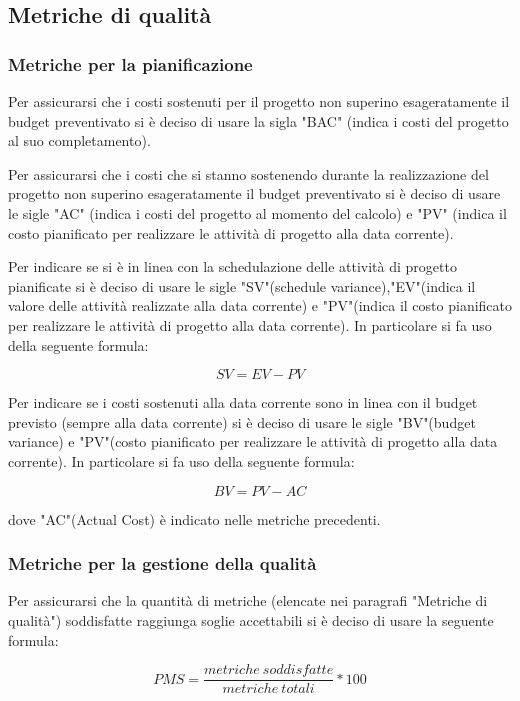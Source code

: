 \subsection{Metriche di qualità}
\subsubsection{Metriche per la pianificazione}
Per assicurarsi che i costi sostenuti per il progetto non superino esageratamente il budget preventivato si è deciso di usare la sigla "BAC" (indica i costi del progetto al suo completamento).

Per assicurarsi che i costi che si stanno sostenendo durante la realizzazione del progetto non superino esageratamente il budget preventivato si è deciso di usare le sigle "AC" (indica i costi del progetto al momento del calcolo) e "PV" (indica il costo pianificato per realizzare le attività di progetto alla data corrente).


Per indicare se si è in linea con la schedulazione delle attività di progetto pianificate si è deciso di usare le sigle "SV"(schedule variance),"EV"(indica il valore delle attività realizzate alla data corrente) e "PV"(indica il costo pianificato per realizzare le attività di progetto alla data corrente). In particolare si fa uso della seguente formula:
\begin{center}
\[SV=EV-PV\]
\end{center}

Per indicare se i costi sostenuti alla data corrente sono in linea con il budget previsto (sempre alla data corrente) si è deciso di usare le sigle "BV"(budget variance) e "PV"(costo pianificato per realizzare le attività di progetto alla data corrente).  In particolare si fa uso della seguente formula:
\begin{center}
\[BV=PV-AC\]
\end{center}
dove "AC"(Actual Cost) è indicato nelle metriche precedenti.

\subsubsection{Metriche per la gestione della qualità}
Per assicurarsi che la quantità di metriche (elencate nei paragrafi "Metriche di qualità")  soddisfatte raggiunga soglie accettabili si è deciso di usare la seguente formula:
\begin{center}
\[PMS=\frac{metriche \ soddisfatte}{metriche \ totali}*100\]
\end{center}

